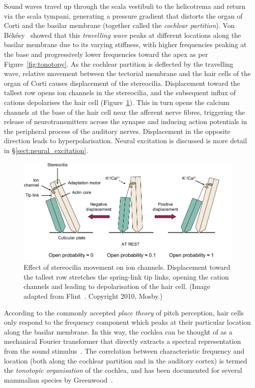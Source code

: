 Sound waves travel up through the scala vestibuli to the helicotrema and return
via the scala tympani, generating a pressure gradient that distorts the organ of
Corti and the basilar membrane (together called the \emph{cochlear partition}).
Von B{\'e}k{\'e}sy~\cite{vonbekesy1960} showed that this \emph{travelling wave}
peaks at different locations along the basilar membrane due to its varying
stiffness, with higher frequencies peaking at the base and progressively lower
frequencies toward the apex as per Figure~\ref{fig:tonotopy}. As the cochlear
partition is deflected by the travelling wave, relative movement between the
tectorial membrane and the hair cells of the organ of Corti causes displacement
of the stereocilia. Displacement toward the tallest row opens ion channels in
the stereocilia, and the subsequent influx of cations depolarises the hair cell
(Figure~\ref{fig:stereocilia}). This in turn opens the calcium channels at the
base of the hair cell near the afferent nerve fibres, triggering the release of
neurotransmitters across the synapse and inducing action potentials in the
peripheral process of the auditory nerves. Displacement in the opposite
direction leads to hyperpolarisation. Neural excitation is discussed is more
detail in \S\ref{sect:neural_excitation}.

\begin{figure}
	\centering
	\includegraphics[width=15cm]{Background/stereocilia}
	\caption[Effect of stereocilia movement on ion channels]{Effect of stereocilia
	movement on ion channels. Displacement toward the tallest row stretches
	the spring-link tip links, opening the cation channels and leading to
	depolarisation of the hair cell. (Image adapted from
	Flint~\etal\cite{flint2010}. Copyright \textcopyright{} 2010, Mosby.)}
	\label{fig:stereocilia}
\end{figure}

According to the commonly accepted \emph{place theory} of pitch perception, hair
cells only respond to the frequency component which peaks at their particular
location along the basilar membrane. In this way, the cochlea can be thought of
as a mechanical Fourier transformer that directly extracts a spectral
representation from the sound stimulus~\cite{vonbekesy1960}. The correlation
between characteristic frequency and location (both along the cochlear partition
and in the auditory cortex) is termed the \emph{tonotopic organisation} of the
cochlea, and has been documented for several mammalian species by
Greenwood~\cite{greenwood1990}.

